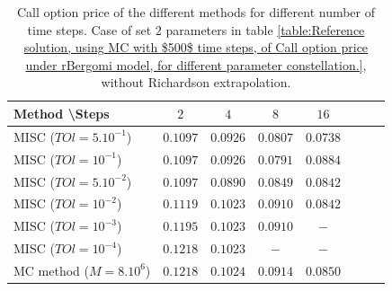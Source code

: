 \documentclass[11pt]{article}
\begin{document}
\begin{table}[h!]
	\centering
	\begin{tabular}{l*{6}{c}r}
		Method \textbackslash  Steps            & $2$ & $4$ & $8$ & $16$  \\
		\hline
		MISC ($TOl=5.10^{-1}$)  & $0.1097$ & $0.0926$ & $0.0807$ & $0.0738$  \\
		MISC ($TOl=10^{-1}$)  &$0.1097$ & $0.0926$ & $0.0791$ & $0.0884$  \\
		MISC ($TOl=5.10^{-2}$)  & $0.1097$ & $0.0890$ & $0.0849$ & $0.0842$  \\
		MISC ($TOl=10^{-2}$)  & $0.1119$&  $0.1023$ & $0.0910$ & $0.0842$ \\
		MISC ($TOl=10^{-3}$)        & $0.1195$ &$0.1023$ &   $0.0910$ &  $-$ \\
		MISC ($TOl=10^{-4}$)        & $0.1218$ &$0.1023$ &  $-$ &  $-$ \\
		\hline
		MC method ($M=8.10^{6}$)   & $0.1218 $  & $0.1024 $  & $0.0914$ & $0.0850 $ \\		
		\hline
	\end{tabular}
	\caption{ Call option price of the different methods for different number of time steps. Case of set $2$ parameters in table \ref{table:Reference solution, using MC with $500$ time steps, of Call option price under rBergomi model, for different parameter constellation.}, without Richardson extrapolation.}
	\label{table: Call option price of the different methods for different number of time steps. Case set 2_linear}
\end{table}
\end{document}
